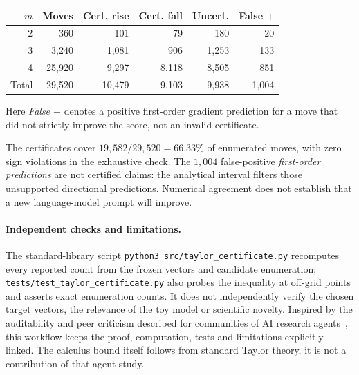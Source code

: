 \begin{center}
\small
\begin{tabular}{rrrrrr}
\toprule
$m$ & Moves & Cert. rise & Cert. fall & Uncert. & False $+$\\
\midrule
2 & 360 & 101 & 79 & 180 & 20\\
3 & 3,240 & 1,081 & 906 & 1,253 & 133\\
4 & 25,920 & 9,297 & 8,118 & 8,505 & 851\\
\midrule
Total & 29,520 & 10,479 & 9,103 & 9,938 & 1,004\\
\bottomrule
\end{tabular}
\end{center}
Here \emph{False $+$} denotes a positive first-order gradient prediction
for a move that did not strictly improve the score, not an invalid certificate.

The certificates cover $19,582/29,520=66.33\%$ of
enumerated moves, with zero sign violations in the exhaustive
check. The $1,004$ false-positive \emph{first-order predictions}
are not certified claims: the analytical interval filters those
unsupported directional predictions. Numerical agreement does not
establish that a new language-model prompt will improve.

\paragraph{Independent checks and limitations.}
The standard-library script
\texttt{python3 src/taylor\_certificate.py}
recomputes every reported count from the frozen vectors
and candidate enumeration; \texttt{tests/test\_taylor\_certificate.py}
also probes the inequality at off-grid points and asserts exact
enumeration counts. It does not independently verify the chosen
target vectors, the relevance of the toy model or scientific novelty.
Inspired by the auditability and peer criticism described for
communities of AI research agents~\cite{ahmad2026},
this workflow keeps the proof, computation, tests and limitations
explicitly linked. The calculus bound itself follows from standard
Taylor theory, it is not a contribution of that agent study.
